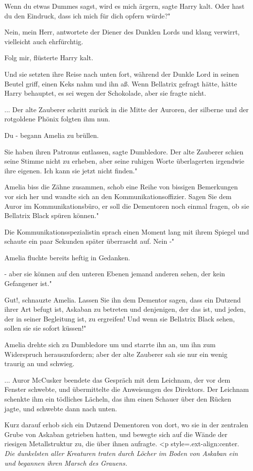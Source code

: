 \glqq{}Wenn du etwas Dummes sagst, wird es mich ärgern\grqq{}, sagte Harry kalt.
\glqq{}Oder hast du den Eindruck, dass ich mich für dich opfern würde?"

\glqq{}Nein, mein Herr\grqq{}, antwortete der Diener des Dunklen Lords und klang
verwirrt, vielleicht auch ehrfürchtig.

\glqq{}Folg mir\grqq{}, flüsterte Harry kalt.

Und sie setzten ihre Reise nach unten fort, während der Dunkle Lord in seinen
Beutel griff, einen Keks nahm und ihn aß. Wenn Bellatrix gefragt hätte, hätte
Harry behauptet, es sei wegen der Schokolade, aber sie fragte nicht.

... Der alte Zauberer schritt zurück in die Mitte der Auroren, der silberne und
der rotgoldene Phönix folgten ihm nun.

\glqq{}Du -\grqq{} begann Amelia zu brüllen.

\glqq{}Sie haben ihren Patronus entlassen\grqq{}, sagte Dumbledore. Der alte
Zauberer schien seine Stimme nicht zu erheben, aber seine ruhigen Worte
überlagerten irgendwie ihre eigenen. \glqq{}Ich kann sie jetzt nicht finden."

Amelia biss die Zähne zusammen, schob eine Reihe von bissigen Bemerkungen vor
sich her und wandte sich an den Kommunikationsoffizier. \glqq{}Sagen Sie dem
Auror im Kommunikationsbüro, er soll die Dementoren noch einmal fragen, ob sie
Bellatrix Black spüren können."

Die Kommunikationsspezialistin sprach einen Moment lang mit ihrem Spiegel und
schaute ein paar Sekunden später überrascht auf. \glqq{}Nein -"

Amelia fluchte bereits heftig in Gedanken.

\glqq{}- aber sie können auf den unteren Ebenen jemand anderen sehen, der kein
Gefangener ist."

\glqq{}Gut!\grqq{}, schnauzte Amelia. \glqq{}Lassen Sie ihn dem Dementor sagen,
dass ein Dutzend ihrer Art befugt ist, Askaban zu betreten und denjenigen, der
das ist, und jeden, der in seiner Begleitung ist, zu ergreifen! Und wenn sie
Bellatrix Black sehen, sollen sie sie sofort küssen!"

Amelia drehte sich zu Dumbledore um und starrte ihn an, um ihn zum Widerspruch
herauszufordern; aber der alte Zauberer sah sie nur ein wenig traurig an und
schwieg.

... Auror McCusker beendete das Gespräch mit dem Leichnam, der vor dem Fenster
schwebte, und übermittelte die Anweisungen des Direktors. Der Leichnam schenkte
ihm ein tödliches Lächeln, das ihm einen Schauer über den Rücken jagte, und
schwebte dann nach unten.

Kurz darauf erhob sich ein Dutzend Dementoren von dort, wo sie in der zentralen
Grube von Askaban getrieben hatten, und bewegte sich auf die Wände der riesigen
Metallstruktur zu, die über ihnen aufragte. <p
style=\grqq{}.ext-align:center\grqq{}. \emph{ Die dunkelsten aller Kreaturen
traten durch Löcher im Boden von Askaban ein und begannen ihren Marsch des
Grauens.}

